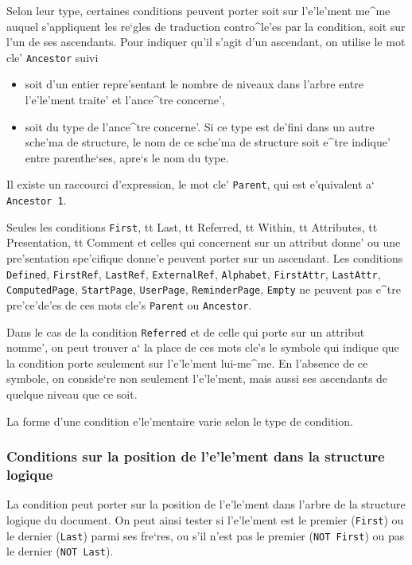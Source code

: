 {Selon leur type, certaines conditions peuvent porter soit sur l'e'le'ment
me^me auquel s'appliquent les re`gles de traduction contro^le'es par la
condition, soit sur l'un de ses ascendants. Pour indiquer qu'il s'agit
d'un ascendant, on utilise le mot cle' {\tt Ancestor} suivi
\begin{itemize}
\item soit d'un entier repre'sentant le nombre de niveaux dans l'arbre
  entre l'e'le'ment traite' et l'ance^tre concerne',
\item soit du type de l'ance^tre concerne'. Si ce type est de'fini dans
  un autre sche'ma de structure, le nom de ce sche'ma de structure soit
  e^tre indique' entre parenthe`ses, apre`s le nom du type.
\end{itemize}
Il existe un raccourci d'expression, le mot cle' {\tt Parent}, qui est
e'quivalent a` {\tt Ancestor 1}.

Seules les conditions {\tt First}, {tt Last}, {tt Referred}, {tt Within},
{tt Attributes}, {tt Presentation}, {tt Comment} et celles qui concernent
sur un attribut donne' ou une pre'sentation spe'cifique donne'e peuvent
porter sur un ascendant. Les conditions {\tt Defined}, {\tt FirstRef},
{\tt LastRef}, {\tt ExternalRef}, {\tt Alphabet}, {\tt FirstAttr},
{\tt LastAttr}, {\tt ComputedPage}, {\tt StartPage}, {\tt UserPage},
{\tt ReminderPage}, {\tt Empty} ne peuvent pas e^tre pre'ce'de'es de
ces mots cle's {\tt Parent} ou {\tt Ancestor}.

Dans le cas de la condition {\tt Referred} et de celle qui porte sur un
attribut nomme', on peut trouver a` la place de ces mots cle's le symbole
{\tt *} qui indique que la condition porte seulement sur l'e'le'ment
lui-me^me. En l'absence de ce symbole, on conside`re non seulement
l'e'le'ment, mais aussi ses ascendants de quelque niveau que ce soit.

La forme d'une condition e'le'mentaire varie selon le type de condition.

\subsubsection{Conditions sur la position de l'e'le'ment dans la structure
logique}

La condition peut porter sur la position de l'e'le'ment dans l'arbre de la
structure logique du document. On peut ainsi tester si l'e'le'ment est le
premier ({\tt First}) ou le dernier ({\tt Last}) parmi ses fre`res, ou s'il
n'est pas le premier ({\tt NOT First}) ou pas le dernier ({\tt NOT Last}).

}
